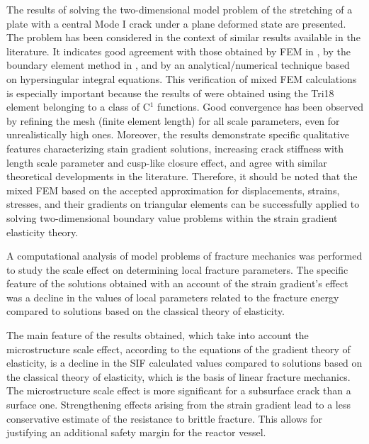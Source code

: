 The results of solving the two-dimensional model problem of the stretching of a plate with a central Mode I crack under a plane deformed state are presented. The problem has been considered in the context of similar results available in the literature. It indicates good agreement with those obtained by FEM in \cite{Chirkov37}, by the boundary element method in \cite{Chirkov31}, and by an analytical/numerical technique based on hypersingular integral equations. This verification of mixed FEM calculations is especially important because the results of \cite{Chirkov37} were obtained using the Tri18 element belonging to a class of C${}^{1}$ functions. Good convergence has been observed by refining the mesh (finite element length) for all scale parameters, even for unrealistically high ones. Moreover, the results demonstrate specific qualitative features characterizing stain gradient solutions, increasing crack stiffness with length scale parameter and cusp-like closure effect, and agree with similar theoretical developments in the literature. Therefore, it should be noted that the mixed FEM based on the accepted approximation for displacements, strains, stresses, and their gradients on triangular elements can be successfully applied to solving two-dimensional boundary value problems within the strain gradient elasticity theory.

A computational analysis of model problems of fracture mechanics was performed to study the scale effect on determining local fracture parameters. The specific feature of the solutions obtained with an account of the strain gradient's effect was a decline in the values of local parameters related to the fracture energy compared to solutions based on the classical theory of elasticity.

The main feature of the results obtained, which take into account the microstructure scale effect, according to the equations of the gradient theory of elasticity, is a decline in the SIF calculated values compared to solutions based on the classical theory of elasticity, which is the basis of linear fracture mechanics. The microstructure scale effect is more significant for a subsurface crack than a surface one. Strengthening effects arising from the strain gradient lead to a less conservative estimate of the resistance to brittle fracture. This allows for justifying an additional safety margin for the reactor vessel.




